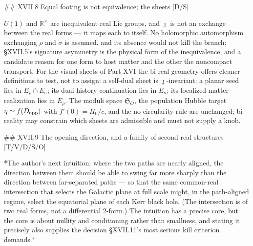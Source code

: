 ## XVII.8 Equal footing is not equivalence; the sheets [D/S]

$U(1)$ and $\mathbb R^\times$ are inequivalent real Lie groups, and $\jmath$ is not an exchange between the real forms — it maps each to itself. No holomorphic automorphism exchanging $\rho$ and $\sigma$ is assumed, and its absence would not kill the branch; §XVII.5's signature asymmetry is the physical form of the inequivalence, and a candidate reason for one form to host matter and the other the noncompact transport. For the visual sheets of Part XVI the bi-real geometry offers cleaner definitions to test, not to assign: a self-dual sheet is $\jmath$-invariant; a planar seed lies in $E_\rho\cap E_\sigma$; its dual-history continuation lies in $E_\sigma$; its localized matter realization lies in $E_\rho$. The moduli space $\mathfrak S_O$, the population Hubble target $\eta\simeq f(D_{\rm app})$ with $f'(0) = H_0/c$, and the no-circularity rule are unchanged; bi-reality may constrain which sheets are admissible and must not supply a knob.

## XVII.9 The opening direction, and a family of second real structures [T/V/D/S/O]

*The author's next intuition: where the two paths are nearly aligned, the direction between them should be able to swing far more sharply than the direction between far-separated paths — so that the same common-real intersection that selects the Galactic plane at full scale might, in the path-aligned regime, select the equatorial plane of each Kerr black hole. (The intersection is of two real forms, not a differential 2-form.) The intuition has a precise core, but the core is about nullity and conditioning rather than smallness, and stating it precisely also supplies the decision §XVII.11's most serious kill criterion demands.*


